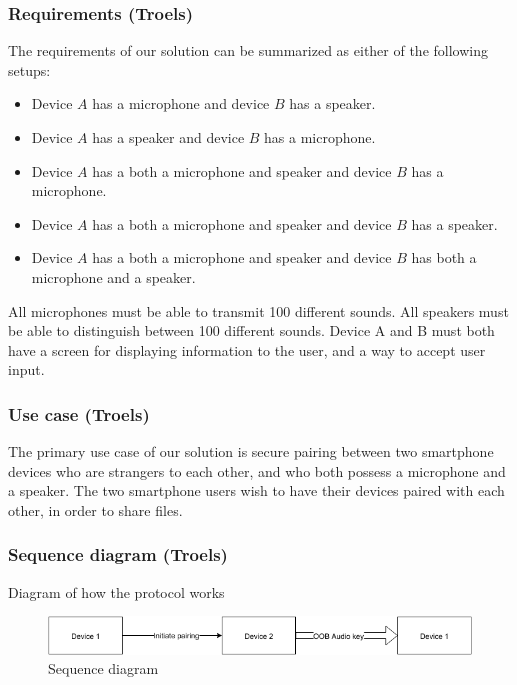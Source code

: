 \documentclass[12pt]{article}
\begin{document}
\subsubsection{Requirements (Troels)}
\label{subs:Requirements}

The requirements of our solution can be summarized as either of the following setups:

\begin{itemize}
    \item Device $A$ has a microphone and device $B$ has a speaker.
    \item Device $A$ has a speaker and device $B$ has a microphone.
    \item Device $A$ has a both a microphone and speaker and device $B$ has a microphone.
    \item Device $A$ has a both a microphone and speaker and device $B$ has a speaker.
    \item Device $A$ has a both a microphone and speaker and device $B$ has both a microphone and a speaker.
\end{itemize}

All microphones must be able to transmit 100 different sounds.
All speakers must be able to distinguish between 100 different sounds.
Device A and B must both have a screen for displaying information to the user, and a way to accept user input.

\subsubsection{Use case (Troels)}
\label{subs:Use case}

The primary use case of our solution is secure pairing between two smartphone devices who are strangers to each other, and who both possess a microphone and a speaker.
The two smartphone users wish to have their devices paired with each other, in order to share files.

\subsubsection{Sequence diagram (Troels)}
\label{subs:Sequence diagram}

Diagram of how the protocol works

\begin{figure}[h!]
    \includegraphics[scale=0.5]{sequence-diagram.png}
    \caption{Sequence diagram}
\end{figure}
\end{document}
